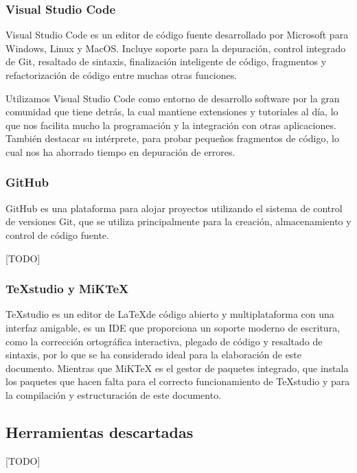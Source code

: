 \subsubsection*{Visual Studio Code}
Visual Studio Code es un editor de código fuente desarrollado por Microsoft para Windows, Linux y MacOS. Incluye soporte para la depuración, control integrado de Git, resaltado de sintaxis, finalización inteligente de código, fragmentos y refactorización de código entre muchas otras funciones. 

Utilizamos Visual Studio Code como entorno de desarrollo software por la gran comunidad que tiene detrás, la cual mantiene extensiones y tutoriales al día, lo que nos facilita mucho la programación y la integración con otras aplicaciones. También destacar su intérprete, para probar pequeños fragmentos de código, lo cual nos ha ahorrado tiempo en depuración de errores.

\subsubsection*{GitHub}
GitHub es una plataforma para alojar proyectos utilizando el sistema de control de versiones Git, que se utiliza principalmente para la creación, almacenamiento y control de código fuente.  

[TODO]

\subsubsection*{TeXstudio y MiKTeX}
TeXstudio es un editor de \LaTeX\space de código abierto y multiplataforma con una interfaz amigable, es un IDE que proporciona un soporte moderno de escritura, como la corrección ortográfica interactiva, plegado de código y resaltado de sintaxis, por lo que se ha considerado ideal para la elaboración de este documento.
Mientras que MiKTeX es el gestor de paquetes integrado, que instala los paquetes que hacen falta para el correcto funcionamiento de TeXstudio y para la compilación y estructuración de este documento.

\subsection{Herramientas descartadas} 

[TODO]

